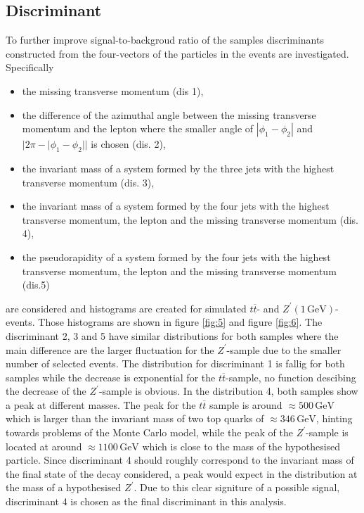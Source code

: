 \subsection{Discriminant}
To further improve signal-to-backgroud ratio of the samples discriminants constructed from the four-vectors of the particles in the events are investigated.
Specifically
\begin{itemize}
  \item the missing transverse momentum (dis 1),
  \item the difference of the azimuthal angle between the missing transverse momentum and the lepton where the smaller angle of $|\phi_1 - \phi_2|$ and
  $|2 \pi - |\phi_1 -\phi_2||$ is chosen (dis. 2),
  \item the invariant mass of a system formed by the three jets with the highest transverse momentum (dis. 3),
  \item the invariant mass of a system formed by the four jets with the highest transverse momentum, the lepton and the missing transverse momentum (dis. 4),
  \item the pseudorapidity of a system formed by the four jets with the highest transverse momentum, the lepton and the missing transverse momentum (dis.5)
\end{itemize}
are considered and histograms are created for simulated $t \overline{t}$- and $Z^\prime(1 \, \si{\giga\eV})$-events. Those histograms are shown in figure 
\ref{fig:5} and figure \ref{fig:6}. The discriminant 2, 3 and 5 have similar distributions for both samples where the main difference are the larger fluctuation 
for the $Z^\prime$-sample due to the smaller number of selected events. The distribution for discriminant 1 is fallig for both samples while the decrease is exponential 
for the $t \overline{t}$-sample, no function descibing the decrease of the $Z^\prime$-sample is obvious. In the distribution 4, both samples show a peak 
at different masses. The peak for the $t \overline{t}$ sample is around $\approx 500 \, \si{\giga\eV}$ which is larger than the invariant mass of 
two top quarks of $\approx 346 \, \si{\giga\eV}$, hinting towards problems of the Monte Carlo model, while the peak of the $Z^\prime$-sample is located at around $\approx 1100 \, \si{\giga\eV}$ which is close to the mass of the 
hypothesised particle. Since discriminant 4 should roughly correspond to the invariant mass of the final state of the decay considered, a peak would expect 
 in the distribution at the mass of a hypothesised $Z^\prime$. Due to this clear signiture of a possible signal, discriminant 4 is chosen as 
the final discriminant in this analysis.


